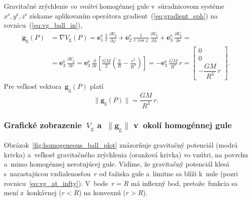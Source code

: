 \documentclass[a4paper, 12pt]{book}
\newcommand{\gidx}{\mathrm g}
\let\vec\mathbf
\begin{document}
Gravitačné zrýchlenie \emph{vo vnútri} homogénnej gule v~súradnicovom 
systéme~$x^\mathrm{s}, y^\mathrm{s}, z^\mathrm{s}$ získame aplikovaním 
operátora gradient~(\ref{eq:gradient_sph}) na rovnicu~(\ref{eq:vg_ball_in}),
%
\begin{equation}
\begin{split}
\vec g_\gidx(P) &= \nabla V_\gidx(P) = \vec e_1^\mathrm{s} \, \frac{1}{r} \, 
\frac{\partial V_\gidx}{\partial \varphi} + \vec e_2^\mathrm{s} \, \frac{1}{r 
\, \cos\varphi} \, \frac{\partial V_\gidx}{\partial \lambda} + \vec 
e_3^\mathrm{s} \, \frac{\partial V_\gidx}{\partial r} =\\
%
&=\vec e_3^\mathrm{s} \, \frac{\partial V_\gidx}{\partial r} = \vec 
e_3^\mathrm{s} \, \frac{\partial}{\partial r}\left[ \frac{GM}{2} \left( 
\frac{3}{R} - \frac{r^2}{R^3} \right) \right] = -\vec e_3^\mathrm{s} \, 
\frac{GM}{R^3} \, r
%
=
%
\begin{bmatrix}
0\\
0\\
-\dfrac{GM}{R^3} \, r
\end{bmatrix}
%
{.}
\end{split}
\end{equation}
%
Pre veľkosť vektora~$\vec g_\gidx(P)$ platí
%
\begin{equation}
\| \vec g_\gidx(P) \| = \frac{GM}{R^3} \, r{.}
\end{equation}

\subsubsection{Grafické zobrazenie~$V_\gidx$ a~$\| \vec g_\gidx \|$ v~okolí 
homogénnej gule}

Obrázok~\ref{fig:homogeneous_ball_plot} znázorňuje gravitačný potenciál (modrá 
krivka) a~veľkosť gravitačného zrýchlenia (oranžová krivka) vo vnútri, na 
povrchu a~mimo homogénnej nerotujúcej gule.  Vidíme, že gravitačný potenciál 
klesá s~narastajúcou vzdialenosťou~$r$ od ťažiska gule a~limitne sa blíži 
k~nule (pozri rovnicu~\ref{eq:vg_at_infty}).  V~bode~$r = R$ má inflexný bod, 
pretože~funkcia sa mení z~konkávnej ($r < R$) na konvexnú ($r > R$).
\end{document}

